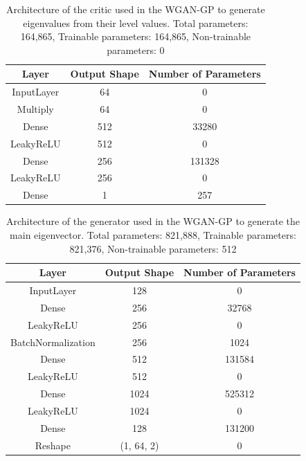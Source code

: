 \documentclass[11pt,a4paper,twoside]{report}
\begin{document}
\begin{table}[]
  \centering
  \begin{tabular}{c c c}
      \hline
      \textbf{Layer} & \textbf{Output Shape} & \textbf{Number of Parameters} \\ \hline
      InputLayer            & 64            & 0                 \\
      Multiply              & 64            & 0                 \\
      Dense                 & 512           & 33280             \\
      LeakyReLU             & 512           & 0                 \\
      Dense                 & 256           & 131328            \\
      LeakyReLU             & 256           & 0                 \\
      Dense                 & 1             & 257               \\
  \end{tabular}
  \caption{Architecture of the critic used in the WGAN-GP to generate eigenvalues from their level values. Total parameters: 164,865, Trainable parameters: 164,865, Non-trainable parameters: 0}
  \label{tab:evals_dB_critic_WGANGP_architecture}
\end{table}

\begin{table}[]
  \centering
  \begin{tabular}{c c c}
      \hline
      \textbf{Layer} & \textbf{Output Shape} & \textbf{Number of Parameters} \\ \hline
      InputLayer            & 128           & 0                 \\
      Dense                 & 256           & 32768             \\
      LeakyReLU             & 256           & 0                 \\
      BatchNormalization    & 256           & 1024              \\
      Dense                 & 512           & 131584            \\
      LeakyReLU             & 512           & 0                 \\
      Dense                 & 1024          & 525312            \\
      LeakyReLU             & 1024          & 0                 \\
      Dense                 & 128           & 131200            \\
      Reshape               & (1, 64, 2)    & 0                 \\
  \end{tabular}
  \caption{Architecture of the generator used in the WGAN-GP to generate the main eigenvector. Total parameters: 821,888, Trainable parameters: 821,376, Non-trainable parameters: 512}
  \label{tab:main_evec_generator_WGANGP_architecture}
\end{table}
\end{document}
